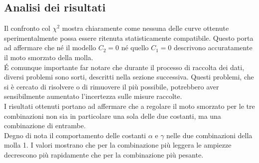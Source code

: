 \documentclass{article}
\begin{document}
\subsection{Analisi dei risultati}
Il confronto col $\chi^2$ mostra chiaramente come nessuna delle curve ottenute sperimentalmente possa essere ritenuta statisticamente compatibile. Questo porta ad affermare che né il modello $C_2=0$ né quello $C_1=0$ descrivono accuratamente il moto smorzato della molla.\\
\'E comunque importante far notare che durante il processo di raccolta dei dati, diversi problemi sono sorti, descritti nella sezione successiva. Questi problemi, che si è cercato di risolvere o di rimuovere il più possibile, potrebbero aver sensibilmente aumentato l'incertezza sulle misure raccolte.\\ 
I risultati ottenuti portano ad affermare che a regolare il moto smorzato per le tre combinazioni non sia in particolare una sola delle due costanti, ma una combinazione di entrambe.\\
Degno di nota il comportamento delle costanti $\alpha$ e $\gamma$ nelle due combinazioni della molla 1. I valori mostrano  che per la combinazione più leggera le ampiezze decrescono più rapidamente che per la combinazione più pesante. 
\end{document}
